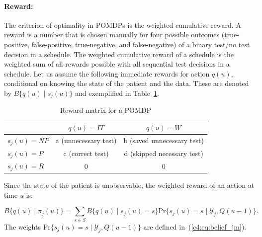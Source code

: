 \begin{subappendices}
\paragraph{\textbf{Reward}:} The criterion of optimality in POMDPs is the weighted cumulative reward. A reward is a number that is chosen manually for four possible outcomes (true-positive, false-positive, true-negative, and false-negative) of a binary test/no test decision in a schedule. The weighted cumulative reward of a schedule is the weighted sum of all rewards possible with all sequential test decisions in a schedule. Let us assume the following immediate rewards for action $q(u)$, conditional on knowing the state of the patient and the data. These are denoted by $B\{q(u) \mid s_j(u)\}$ and exemplified in Table~\ref{c4:table:rewards}.
\begin{table}[htb]
\small
\centering
\caption{Reward matrix for a POMDP}
\label{c4:table:rewards}
\begin{tabular}{l|cc} 
 \toprule
  & $q(u)=IT$ & $q(u)=W$ \\
  \midrule
 $s_j(u)=NP$ & a (unnecessary test) & b (saved unnecessary test) \\
  $s_j(u)=P$ & c (correct test) & d (skipped necessary test) \\
  $s_j(u)=R$ & 0 & 0 \\
\bottomrule
\end{tabular}
\end{table}
Since the state of the patient is unobservable, the weighted reward of an action at time $u$ is:

\begin{equation*}
B\big\{q(u) \mid \pi_j(u)\big\} = \sum_{s \in S} B\big\{q(u) \mid s_j(u) = s\big\} \mbox{Pr}\big\{s_j(u) = s \mid \mathcal{Y}_j, Q(u-1)\big\}.
\end{equation*}
The weights $\mbox{Pr}\big\{s_j(u) = s \mid \mathcal{Y}_j, Q(u-1)\big\}$ are defined in~(\ref{c4:eq:belief_jm}). 


\end{subappendices}
